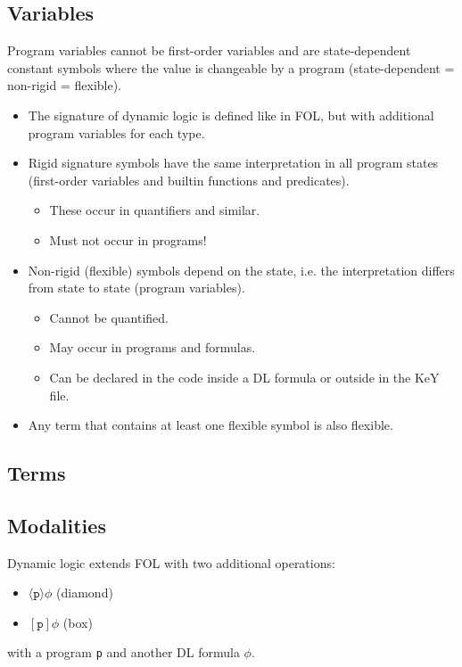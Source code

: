 	\subsection{Variables}
		Program variables cannot be first-order variables and are state-dependent constant symbols where the value is changeable by a program (state-dependent = non-rigid = flexible).

		\begin{itemize}
			\item The signature of dynamic logic is defined like in FOL, but with additional program variables for each type.
			\item Rigid signature symbols have the same interpretation in all program states (first-order variables and builtin functions and predicates).
				\begin{itemize}
					\item These occur in quantifiers and similar.
					\item Must not occur in programs!
				\end{itemize}
			\item Non-rigid (flexible) symbols depend on the state, i.e. the interpretation differs from state to state (program variables).
				\begin{itemize}
					\item Cannot be quantified.
					\item May occur in programs and formulas.
					\item Can be declared in the code inside a DL formula or outside in the KeY file.
				\end{itemize}
			\item Any term that contains at least one flexible symbol is also flexible.
		\end{itemize}

	\subsection{Terms}

	\subsection{Modalities}
		Dynamic logic extends FOL with two additional operations:
		\begin{itemize}
			\item \( \langle \texttt{p} \rangle \phi \) (diamond)
			\item \( [\texttt{p}] \phi \) (box)
		\end{itemize}
		with a program \texttt{p} and another DL formula \(\phi\).

